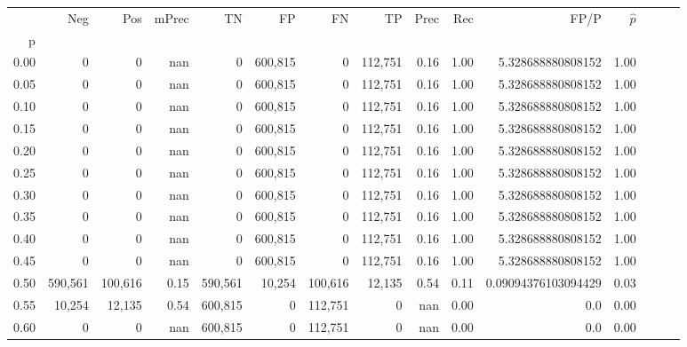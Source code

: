 \begin{tabular}{rrrrrrrrrrrrrrr}
\toprule
{} &      Neg &      Pos & mPrec &       TN &       FP &       FN &       TP &  Prec &   Rec &                 FP/P & $\hat{p}$ \\
p    &          &          &       &          &          &          &          &       &       &                      &           \\
\midrule
0.00 &        0 &        0 &   nan &        0 &  600,815 &        0 &  112,751 &  0.16 &  1.00 &    5.328688880808152 &      1.00 \\
0.05 &        0 &        0 &   nan &        0 &  600,815 &        0 &  112,751 &  0.16 &  1.00 &    5.328688880808152 &      1.00 \\
0.10 &        0 &        0 &   nan &        0 &  600,815 &        0 &  112,751 &  0.16 &  1.00 &    5.328688880808152 &      1.00 \\
0.15 &        0 &        0 &   nan &        0 &  600,815 &        0 &  112,751 &  0.16 &  1.00 &    5.328688880808152 &      1.00 \\
0.20 &        0 &        0 &   nan &        0 &  600,815 &        0 &  112,751 &  0.16 &  1.00 &    5.328688880808152 &      1.00 \\
0.25 &        0 &        0 &   nan &        0 &  600,815 &        0 &  112,751 &  0.16 &  1.00 &    5.328688880808152 &      1.00 \\
0.30 &        0 &        0 &   nan &        0 &  600,815 &        0 &  112,751 &  0.16 &  1.00 &    5.328688880808152 &      1.00 \\
0.35 &        0 &        0 &   nan &        0 &  600,815 &        0 &  112,751 &  0.16 &  1.00 &    5.328688880808152 &      1.00 \\
0.40 &        0 &        0 &   nan &        0 &  600,815 &        0 &  112,751 &  0.16 &  1.00 &    5.328688880808152 &      1.00 \\
0.45 &        0 &        0 &   nan &        0 &  600,815 &        0 &  112,751 &  0.16 &  1.00 &    5.328688880808152 &      1.00 \\
0.50 &  590,561 &  100,616 &  0.15 &  590,561 &   10,254 &  100,616 &   12,135 &  0.54 &  0.11 &  0.09094376103094429 &      0.03 \\
0.55 &   10,254 &   12,135 &  0.54 &  600,815 &        0 &  112,751 &        0 &   nan &  0.00 &                  0.0 &      0.00 \\
0.60 &        0 &        0 &   nan &  600,815 &        0 &  112,751 &        0 &   nan &  0.00 &                  0.0 &      0.00 \\

\end{tabular}
